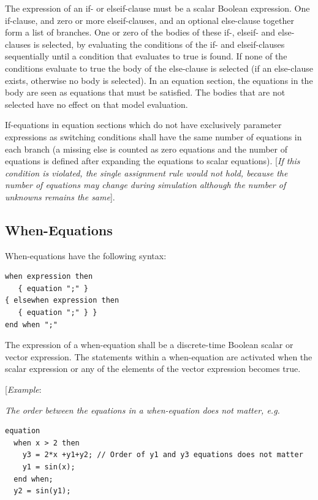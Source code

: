 \documentclass[10pt,a4paper]{report}
\def\doublelabel#1{\label{#1}\hypertarget{#1}{}}
\begin{document}
The expression of an if- or elseif-clause must be a scalar Boolean
expression. One if-clause, and zero or more elseif-clauses, and an
optional else-clause together form a list of branches. One or zero of
the bodies of these if-, elseif- and else-clauses is selected, by
evaluating the conditions of the if- and elseif-clauses sequentially
until a condition that evaluates to true is found. If none of the
conditions evaluate to true the body of the else-clause is selected (if
an else-clause exists, otherwise no body is selected). In an equation
section, the equations in the body are seen as equations that must be
satisfied. The bodies that are not selected have no effect on that model
evaluation.

If-equations in equation sections which do not have exclusively
parameter expressions as switching conditions shall have the same number
of equations in each branch (a missing else is counted as zero equations
and the number of equations is defined after expanding the equations to
scalar equations). {[}\emph{If this condition is violated, the single
assignment rule would not hold, because the number of equations may
change during simulation although the number of unknowns remains the
same}{]}.

\subsection{When-Equations}\doublelabel{when-equations}

When-equations have the following syntax:
\begin{lstlisting}[language=grammar]
when expression then 
   { equation ";" }   
{ elsewhen expression then     
   { equation ";" } }   
end when ";" 
\end{lstlisting}

The expression of a when-equation shall be a discrete-time Boolean
scalar or vector expression. The statements within a when-equation are
activated when the scalar expression or any of the elements of the
vector expression becomes true.

{[}\emph{Example}:

\emph{The order between the equations in a when-equation does not
matter, e.g.}

\begin{lstlisting}[language=modelica]
equation   
  when x > 2 then
    y3 = 2*x +y1+y2; // Order of y1 and y3 equations does not matter     
	y1 = sin(x);     
  end when;   
  y2 = sin(y1);
\end{lstlisting}
\end{document}
